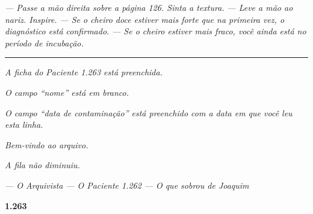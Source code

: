 \documentclass[14pt,openany]{extbook}
\begin{document}
\begin{center}
\vspace{0.5em}

\noindent\textit{--- Passe a mão direita sobre a página 126. Sinta a textura.}
\noindent\textit{--- Leve a mão ao nariz. Inspire.}
\noindent\textit{--- Se o cheiro doce estiver mais forte que na primeira vez, o diagnóstico está confirmado.}
\noindent\textit{--- Se o cheiro estiver mais fraco, você ainda está no período de incubação.}

\vspace{1.5em}

\noindent\textcolor{sangue}{\rule{0.15\textwidth}{0.5pt}}

\vspace{1.5em}

\noindent\textit{A ficha do Paciente 1.263 está preenchida.}

\noindent\textit{O campo \textquotedblleft{}nome\textquotedblright{} está em branco.}

\noindent\textit{O campo \textquotedblleft{}data de contaminação\textquotedblright{} está preenchido com a data em que você leu esta linha.}

\noindent\textit{Bem-vindo ao arquivo.}

\noindent\textit{A fila não diminuiu.}

\vspace{1.5em}

\noindent\textit{--- O Arquivista}
\vspace{0.3em}
\noindent\textit{--- O Paciente 1.262}
\vspace{0.3em}
\noindent\textit{--- O que sobrou de Joaquim}

\vspace{2em}
\textcolor{olho}{\large \textbf{1.263}}

\end{center}
\vfill



\backmatter




\end{document}
